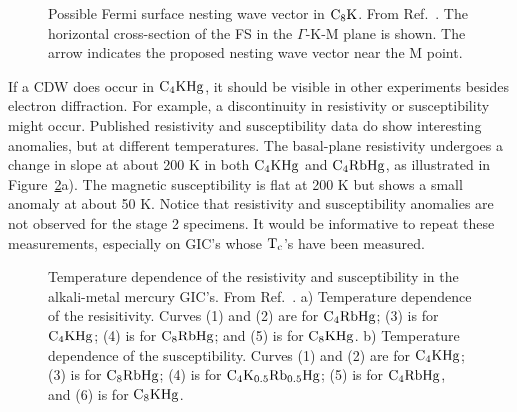 \begin{figure}
\vspace{12cm}
\caption[Possible Fermi surface nesting wave vector in $\rm C_8K$]{Possible
Fermi     surface     nesting  wave    vector   in    $\rm    C_8K$.   From
Ref.~\cite{inoshita77}.  The  horizontal cross-section  of  the  FS  in the
$\Gamma$-K-M plane is shown.  The arrow indicates the proposed nesting wave
vector near the M point.}
\label{nesting}
\end{figure}

        If a CDW does occur in $\rm C_4KHg$,  it should be visible in other
experiments besides electron diffraction.  For  example, a discontinuity in
resistivity   or susceptibility might   occur.   Published resistivity  and
susceptibility data  do   show  interesting  anomalies, but at    different
temperatures.\cite{elmakrini80b}  The  basal-plane  resistivity undergoes a
change in slope at about 200 K in  both  $\rm C_4KHg$ and $\rm C_4RbHg$, as
illustrated in Figure~\ref{stitransdata}a).  The magnetic susceptibility is
flat at 200 K but  shows   a  small anomaly  at  about 50 K.   Notice  that
resistivity  and susceptibility anomalies are  not observed for the stage 2
specimens.   It  would   be  informative   to   repeat these  measurements,
especially on GIC's whose $\rm T_c$'s have been measured.

\begin{figure}
\vspace{20cm}
\caption[Temperature dependence of the resistivity and susceptibility in
the alkali-metal mercury  GIC's]{Temperature dependence of  the resistivity
and    susceptibility in     the   alkali-metal     mercury  GIC's.    From
Ref.~\cite{elmakrini80b}.   a) Temperature dependence of  the resisitivity.
Curves (1) and (2) are for $\rm  C_4RbHg$; (3) is  for $\rm C_4KHg$; (4) is
for $\rm C_8RbHg$; and (5) is for $\rm  C_8KHg$.  b) Temperature dependence
of the susceptibility.  Curves (1) and (2) are for $\rm C_4KHg$; (3) is for
$\rm  C_8RbHg$;  (4) is for  $\rm C_4K_{0.5}Rb_{0.5}Hg$;  (5) is  for  $\rm
C_4RbHg$, and (6) is for $\rm C_8KHg$.}
\label{stitransdata}
\end{figure}

